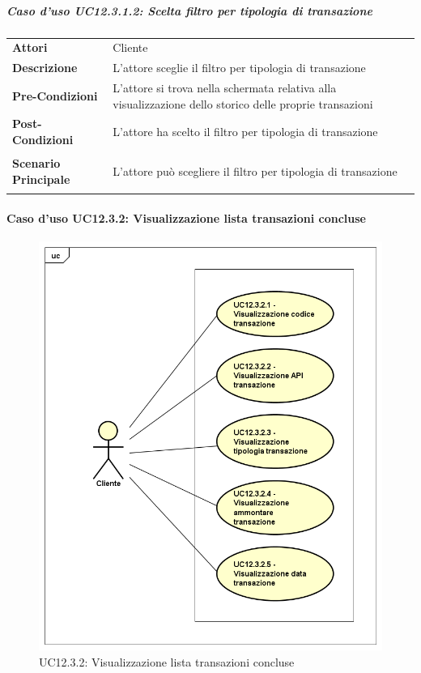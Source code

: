 \subparagraph{Caso d'uso UC12.3.1.2: Scelta filtro per tipologia di transazione}
\label{UC12_3_1_2}

\begin{minipage}{\linewidth}
	\begin{tabular}{ l | p{11cm}}
		\hline
		\rowcolor{Gray}
		\multicolumn{2}{c}{UC12.3.1.2 - Scelta filtro per tipologia di transazione} \\
		\hline
		\textbf{Attori} & Cliente \\
		\textbf{Descrizione} & L'attore sceglie il filtro per tipologia di transazione \\
	\textbf{Pre-Condizioni} & L'attore si trova nella schermata relativa alla visualizzazione dello storico delle proprie transazioni \\
	\textbf{Post-Condizioni} & L'attore ha scelto il filtro per tipologia di transazione \\
	\textbf{Scenario Principale} & 
	\begin{enumerate*}[label=(\arabic*.),itemjoin={\newline}]
		\item L'attore può scegliere il filtro per tipologia di transazione
	\end{enumerate*}
	\end{tabular}
\end{minipage}

\newpage
\paragraph{Caso d'uso UC12.3.2: Visualizzazione lista transazioni concluse}
\label{UC12_3_2}
\begin{figure}[ht]
	\centering
	\includegraphics[scale=0.45]{UML/UC12_3_2.png}
	\caption{UC12.3.2: Visualizzazione lista transazioni concluse}
\end{figure}

